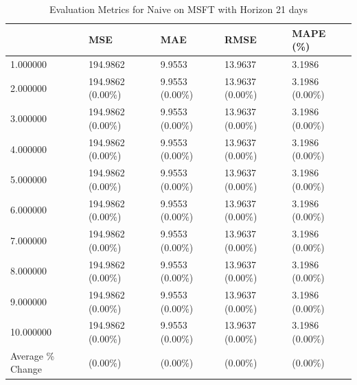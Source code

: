 \begin{table}
\caption{Evaluation Metrics for Naive on MSFT with Horizon 21 days}
\label{tab:naive_MSFT_h21_metrics}
\begin{tabular}{lllll}
\toprule
 & MSE & MAE & RMSE & MAPE (\%) \\
\midrule
1.000000 & 194.9862 & 9.9553 & 13.9637 & 3.1986 \\
2.000000 & 194.9862 (0.00\%) & 9.9553 (0.00\%) & 13.9637 (0.00\%) & 3.1986 (0.00\%) \\
3.000000 & 194.9862 (0.00\%) & 9.9553 (0.00\%) & 13.9637 (0.00\%) & 3.1986 (0.00\%) \\
4.000000 & 194.9862 (0.00\%) & 9.9553 (0.00\%) & 13.9637 (0.00\%) & 3.1986 (0.00\%) \\
5.000000 & 194.9862 (0.00\%) & 9.9553 (0.00\%) & 13.9637 (0.00\%) & 3.1986 (0.00\%) \\
6.000000 & 194.9862 (0.00\%) & 9.9553 (0.00\%) & 13.9637 (0.00\%) & 3.1986 (0.00\%) \\
7.000000 & 194.9862 (0.00\%) & 9.9553 (0.00\%) & 13.9637 (0.00\%) & 3.1986 (0.00\%) \\
8.000000 & 194.9862 (0.00\%) & 9.9553 (0.00\%) & 13.9637 (0.00\%) & 3.1986 (0.00\%) \\
9.000000 & 194.9862 (0.00\%) & 9.9553 (0.00\%) & 13.9637 (0.00\%) & 3.1986 (0.00\%) \\
10.000000 & 194.9862 (0.00\%) & 9.9553 (0.00\%) & 13.9637 (0.00\%) & 3.1986 (0.00\%) \\
Average \% Change & (0.00\%) & (0.00\%) & (0.00\%) & (0.00\%) \\
\bottomrule
\end{tabular}
\end{table}

